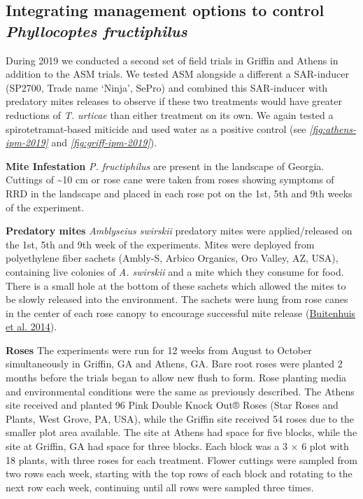 \documentclass{ufdissertation}[overrideChapters] %
\begin{document}
{\hypertarget{integrating-management-options-to-control-phyllocoptes-fructiphilus}{%
\subsection{\texorpdfstring{Integrating management options to control \emph{Phyllocoptes fructiphilus}}{Integrating management options to control Phyllocoptes fructiphilus}}\label{integrating-management-options-to-control-phyllocoptes-fructiphilus}}

During 2019 we conducted a second set of field trials in Griffin and Athens in addition to the ASM trials. We tested ASM alongside a different a SAR-inducer (SP2700, Trade name `Ninja', SePro) and combined this SAR-inducer with predatory mites releases to observe if these two treatments would have greater reductions of \emph{T. urticae} than either treatment on its own. We again tested a spirotetramat-based miticide and used water as a positive control (see \emph{\ref{fig:athens-ipm-2019}} and \emph{\ref{fig:griff-ipm-2019}}).

\textbf{Mite Infestation}
\emph{P. fructiphilus} are present in the landscape of Georgia. Cuttings of \textasciitilde10 cm or rose cane were taken from roses showing symptoms of RRD in the landscape and placed in each rose pot on the 1st, 5th and 9th weeks of the experiment.

\textbf{Predatory mites}
\emph{Amblyseius swirskii} predatory mites were applied/released on the 1st, 5th and 9th week of the experiments. Mites were deployed from polyethylene fiber sachets (Ambly-S, Arbico Organics, Oro Valley, AZ, USA), containing live colonies of \emph{A. swirskii} and a mite which they consume for food. There is a small hole at the bottom of these sachets which allowed the mites to be slowly released into the environment. The sachets were hung from rose canes in the center of each rose canopy to encourage successful mite release (\protect\hyperlink{ref-Buitenhuis2014}{Buitenhuis et al. 2014}).

\textbf{Roses}
The experiments were run for 12 weeks from August to October simultaneously in Griffin, GA and Athens, GA. Bare root roses were planted 2 months before the trials began to allow new flush to form. Rose planting media and environmental conditions were the same as previously described. The Athens site received and planted 96 Pink Double Knock Out® Roses (Star Roses and Plants, West Grove, PA, USA), while the Griffin site received 54 roses due to the smaller plot area available. The site at Athens had space for five blocks, while the site at Griffin, GA had space for three blocks. Each block was a 3 \(\times\) 6 plot with 18 plants, with three roses for each treatment. Flower cuttings were sampled from two rows each week, starting with the top rows of each block and rotating to the next row each week, continuing until all rows were sampled three times.

}
\end{document}
